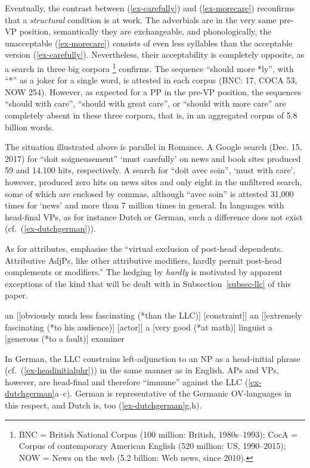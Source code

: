 \documentclass[output=paper
  ,nobabel
  ,uniformtopskip %
]{langscibook}
\begin{document}
\noindent
Eventually, the contrast between (\ref{ex-carefully}) and (\ref{ex-morecare}) reconfirms that a \emph{structural} condition is at work. The adverbials are in the very same pre-VP position, semantically they are exchangeable, and phonologically, the unacceptable (\ref{ex-morecare}) consists of even less syllables than the acceptable version (\ref{ex-carefully}). Nevertheless, their acceptability is completely opposite, as a search in three big corpora%
%
\footnote{BNC = British National Corpus (100 million: British, 1980s--1993); CocA = Corpus of contemporary American English (520 million: US, 1990--2015); NOW = News on the web (5.2 billion: Web news, since 2010).}
confirms. The sequence ``should more *ly'', with ``*'' as a joker for a single word, is attested in each corpus (BNC: 17, COCA 53, NOW 254). However, as expected for a PP in the pre-VP position, the sequences ``should with care'', ``should with great care'', or ``should with more care'' are completely absent in these three corpora, that is, in an aggregated corpus of 5.8 billion words.

The situation illustrated above is parallel in Romance. A Google search (Dec. 15, 2017) for ``doit soigneusement'' `must carefully' on news and book sites produced 59 and 14.100 hits, respectively. A search for ``doit avec soin'', `must with care', however, produced zero hits on news sites and only eight in the unfiltered search, some of which are enclosed by commas, although ``avec soin'' is attested 31,000 times for ‘news’ and more than 7 million times in general. In languages with head-final VPs, as for instance Dutch or German, such a difference does not exist (cf.\ (\ref{ex-dutchgerman})).

As for attributes, \citet*[551]{HuddlestonPullum2002} emphasise the ``virtual exclusion of post-head dependents. Attributive AdjPs, like other attributive modifiers, hardly permit post-head complements or modifiers.'' The hedging by \emph{hardly} is motivated by apparent exceptions of the kind that will be dealt with in Subsection~\ref{subsec-llc} of this paper.

\eal\label{ex-adjunct-np}
\ex an [[obviously much less fascinating (*than the LLC)] [constraint]]
\ex an [[extremely fascinating (*to his audience)] [actor]]
\ex a [very good (*at math)] linguist
\ex a [generous (*to a fault)] examiner
\zl

\noindent
In German, the LLC constrains left-adjunction to an NP as a head-initial phrase (cf.\ (\ref{ex-headinitialphr})) in the same manner as in English. APs and VPs, however, are head-final and therefore ``immune'' against the LLC (\ref{ex-dutchgerman}a--c). German is representative of the Germanic OV-languages in this respect, and Dutch is, too (\ref{ex-dutchgerman}g,h).
\end{document}
